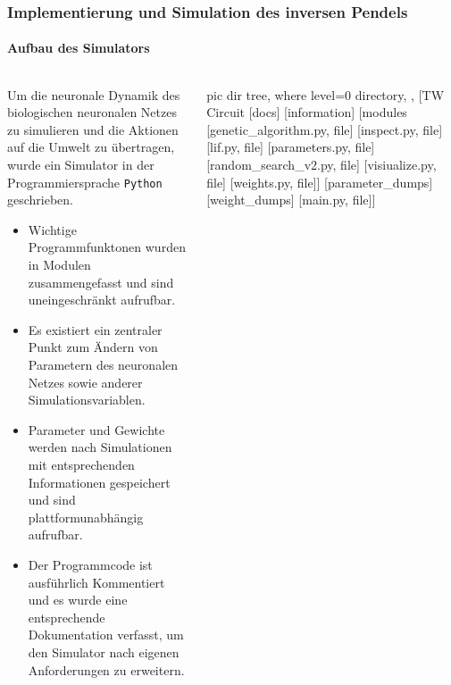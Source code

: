 \documentclass[10pt,t,aspectratio=1610]{beamer}
\newcommand{\ChapterCartpole}{Implementierung und Simulation des inversen Pendels}
\begin{document}
\begin{frame}
\frametitle{\ChapterCartpole}
\framesubtitle{Aufbau des Simulators}
\vspace{0.3cm}
\begin{columns}[T,onlytextwidth]
	\begin{column}{0.7\textwidth}
		Um die neuronale Dynamik des biologischen neuronalen Netzes zu simulieren und die Aktionen auf die Umwelt zu übertragen, wurde ein Simulator in der Programmiersprache \texttt{Python} geschrieben.
		\vspace{0.1cm}
		\begin{itemize}
			\item Wichtige Programmfunktonen wurden in Modulen zusammengefasst und sind uneingeschränkt aufrufbar.
			\item Es existiert ein zentraler Punkt zum Ändern von Parametern des neuronalen Netzes sowie anderer Simulationsvariablen.
			\item Parameter und Gewichte werden nach Simulationen mit entsprechenden Informationen gespeichert und sind plattformunabhängig aufrufbar.
			\item Der Programmcode ist ausführlich Kommentiert und es wurde eine entsprechende Dokumentation verfasst, um den Simulator nach eigenen Anforderungen zu erweitern.
		\end{itemize}
	\end{column}
	\hspace{-0.8cm}
	\begin{column}{0.28\textwidth}
		\vspace{-0.7cm}
		\resizebox{4cm}{!} {
		\begin{forest}
			pic dir tree,
			where level=0{}{%
				directory,
			},
			[TW Circuit
			[docs]
			[information]
			[modules
			[genetic\_algorithm.py, file]
			[inspect.py, file]
			[lif.py, file]
			[parameters.py, file]
			[random\_search\_v2.py, file]
			[visiualize.py, file]
			[weights.py, file]]
			[parameter\_dumps]
			[weight\_dumps]
			[main.py, file]]
		\end{forest}
		}
	\end{column}
\end{columns}
\end{frame}

\end{document}
